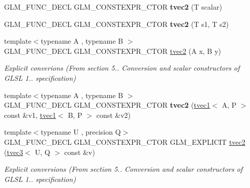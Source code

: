 \begin{DoxyCompactItemize}
G\+L\+M\+\_\+\+F\+U\+N\+C\+\_\+\+D\+E\+CL G\+L\+M\+\_\+\+C\+O\+N\+S\+T\+E\+X\+P\+R\+\_\+\+C\+T\+OR {\bfseries tvec2} (T scalar)
\item 
\mbox{\label{structglm_1_1tvec2_ab4da814e5111a69db7c57f3727fc52bb}} 
G\+L\+M\+\_\+\+F\+U\+N\+C\+\_\+\+D\+E\+CL G\+L\+M\+\_\+\+C\+O\+N\+S\+T\+E\+X\+P\+R\+\_\+\+C\+T\+OR {\bfseries tvec2} (T s1, T s2)
\item 
\mbox{\label{structglm_1_1tvec2_ad528be53a77734a77e01ffe80c71d42e}} 
{\footnotesize template$<$typename A , typename B $>$ }\\G\+L\+M\+\_\+\+F\+U\+N\+C\+\_\+\+D\+E\+CL G\+L\+M\+\_\+\+C\+O\+N\+S\+T\+E\+X\+P\+R\+\_\+\+C\+T\+OR \hyperlink{structglm_1_1tvec2_ad528be53a77734a77e01ffe80c71d42e}{tvec2} (A x, B y)
\begin{DoxyCompactList}\small\item\em Explicit converions (From section 5.. Conversion and scalar constructors of G\+L\+SL 1.. specification) \end{DoxyCompactList}\item 
\mbox{\label{structglm_1_1tvec2_a6284a7d6b9a31303f992b42894d47db7}} 
{\footnotesize template$<$typename A , typename B $>$ }\\G\+L\+M\+\_\+\+F\+U\+N\+C\+\_\+\+D\+E\+CL G\+L\+M\+\_\+\+C\+O\+N\+S\+T\+E\+X\+P\+R\+\_\+\+C\+T\+OR {\bfseries tvec2} (\hyperlink{structglm_1_1tvec1}{tvec1}$<$ A, P $>$ const \&v1, \hyperlink{structglm_1_1tvec1}{tvec1}$<$ B, P $>$ const \&v2)
\item 
\mbox{\label{structglm_1_1tvec2_a230aa7113a4beee76efb778695d009dc}} 
{\footnotesize template$<$typename U , precision Q$>$ }\\G\+L\+M\+\_\+\+F\+U\+N\+C\+\_\+\+D\+E\+CL G\+L\+M\+\_\+\+C\+O\+N\+S\+T\+E\+X\+P\+R\+\_\+\+C\+T\+OR G\+L\+M\+\_\+\+E\+X\+P\+L\+I\+C\+IT \hyperlink{structglm_1_1tvec2_a230aa7113a4beee76efb778695d009dc}{tvec2} (\hyperlink{structglm_1_1tvec3}{tvec3}$<$ U, Q $>$ const \&v)
\begin{DoxyCompactList}\small\item\em Explicit conversions (From section 5.. Conversion and scalar constructors of G\+L\+SL 1.. specification) \end{DoxyCompactList}\item 

\end{DoxyCompactItemize}
